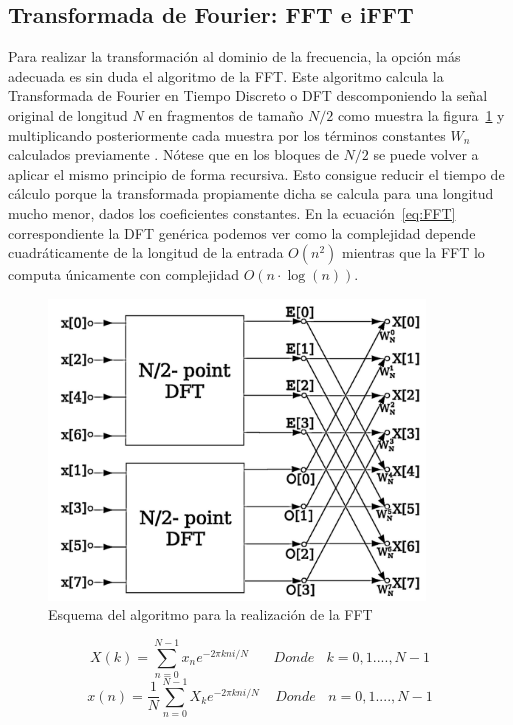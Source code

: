 \subsection{Transformada de Fourier: FFT e iFFT}

Para realizar la transformación al dominio de la frecuencia, la opción más adecuada es sin duda el algoritmo de la FFT. Este algoritmo calcula la Transformada de Fourier en Tiempo Discreto o DFT descomponiendo la señal original de longitud $N$ en fragmentos de tamaño $N/2$ como muestra la figura~\ref{fig:fft} y  multiplicando posteriormente cada muestra por los términos constantes $W_{n}$ calculados previamente \cite{Oppenheim}. Nótese que en los bloques de $N/2$ se puede volver a aplicar el mismo principio de forma recursiva. Esto consigue reducir el tiempo de cálculo porque la transformada propiamente dicha se calcula para una longitud mucho menor, dados los coeficientes constantes. En la ecuación~\ref{eq:FFT} correspondiente la DFT genérica podemos ver como la complejidad depende cuadráticamente de la longitud de la entrada $O({n^{2}})$ mientras que la FFT lo computa únicamente con complejidad $O({n\cdot\log (n)})$.

\begin{figure}[!ht]
\begin{center}
\includegraphics[width=10cm]{img/dft.png}
\caption{\label{fig:fft}Esquema del algoritmo para la realización de la FFT}
\end{center}
\end{figure}

\begin{equation}
\label{eq:FFT}
X(k) =  \sum_{n = 0}^{N - 1} x_{n}e^{-2\pi kni/N}~~~~~~~~Donde~~~~k = 0, 1...., N-1
\end{equation}
\begin{equation}
\label{eq:iFFT}
x(n) = \frac{1}{N} \sum_{n = 0}^{N - 1} X_{k}e^{-2\pi kni/N}~~~~~Donde~~~~n = 0, 1...., N-1
\end{equation}

